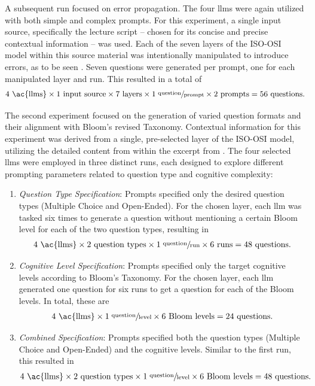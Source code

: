  A subsequent run focused on error propagation. The four \ac{llms} were again utilized with both simple and complex prompts. For this experiment, a single input source, specifically the lecture script -- chosen for its concise and precise contextual information -- was used. Each of the seven layers of the ISO-OSI model within this source material was intentionally manipulated to introduce errors, as to be seen . Seven questions were generated per prompt, one for each manipulated layer and run. This resulted in a total of \begin{align}4 \text{ \ac{llms}} \times 1 \text{ input source} \times 7 \text{ layers} \times 1 \sfrac{\text{ question}}{\text{prompt}} \times 2 \text{ prompts} = 56 \text{ questions.}\end{align}

\pagebreak

 The second experiment focused on the generation of varied question formats and their alignment with Bloom's revised Taxonomy. Contextual information for this experiment was derived from a single, pre-selected layer of the ISO-OSI model, utilizing the detailed content from  within the excerpt from \cite{tanenbaum_computer_2013}. The four selected \ac{llms} were employed in three distinct runs, each designed to explore different prompting parameters related to question type and cognitive complexity:

\begin{enumerate}
    \item \textit{Question Type Specification}: Prompts specified only the desired question types (Multiple Choice and Open-Ended). For the chosen layer, each \ac{llm} was tasked six times to generate a question without mentioning a certain Bloom level for each of the two question types, resulting in \begin{align}4 \text{ \ac{llms}} \times 2 \text{ question types} \times 1 \sfrac{\text{ question}}{\text{run}}\times 6 \text{ runs} = 48 \text{ questions.}\end{align}
    \item \textit{Cognitive Level Specification}: Prompts specified only the target cognitive levels according to Bloom's Taxonomy. For the chosen layer, each \ac{llm} generated one question for six runs to get a question for each of the Bloom levels. In total, these are  \begin{align}4 \text{ \ac{llms}} \times 1 \sfrac{\text{ question}}{\text{level}} \times 6 \text{ Bloom levels} = 24 \text{ questions.}\end{align}
    \item \textit{Combined Specification}: Prompts specified both the question types (Multiple Choice and Open-Ended) and the cognitive levels. Similar to the first run, this resulted in \begin{align}4 \text{ \ac{llms}} \times 2 \text{ question types} \times 1 \sfrac{\text{ question}}{\text{level}} \times 6 \text{ Bloom levels} = 48 \text{ questions.}\end{align}
\end{enumerate}

